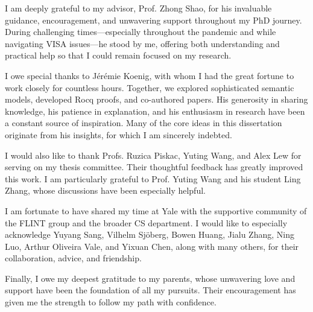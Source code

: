 \documentclass[letterpaper,11pt]{yalephd}
\theoremstyle{definition}
\begin{document}
I am deeply grateful to my advisor,
Prof. Zhong Shao, for his invaluable guidance,
encouragement,
and unwavering support throughout my PhD journey.
During challenging times---especially throughout the pandemic and
while navigating VISA issues---he stood by me,
offering both understanding and
practical help so that I could remain focused on my research.

I owe special thanks to Jérémie Koenig,
with whom I had the great fortune to work closely
for countless hours.
Together,
we explored sophisticated semantic models,
developed Rocq proofs,
and co-authored papers.
His generosity in sharing knowledge,
his patience in explanation,
and his enthusiasm in research
have been a constant source of inspiration.
Many of the core ideas in this dissertation
originate from his insights,
for which I am sincerely indebted.

I would also like to thank
Profs. Ruzica Piskac, Yuting Wang, and Alex Lew
for serving on my thesis committee.
Their thoughtful feedback has greatly improved this work.
I am particularly grateful to Prof. Yuting Wang
and his student Ling Zhang,
whose discussions have been especially helpful.

I am fortunate to have shared my time
at Yale
with the supportive community of the FLINT group
and the broader CS department.
I would like to especially acknowledge
Yuyang Sang, Vilhelm Sjöberg, Bowen Huang, Jialu Zhang,
Ning Luo, Arthur Oliveira Vale, and Yixuan Chen,
along with many others,
for their collaboration, advice, and friendship.

Finally,
I owe my deepest gratitude to my parents,
whose unwavering love and support
have been the foundation of all my pursuits.
Their encouragement has given me
the strength to follow my path with confidence.

\mainmatter



















\backmatter

% 

\cleardoublepage
{}
{}


\end{document}
